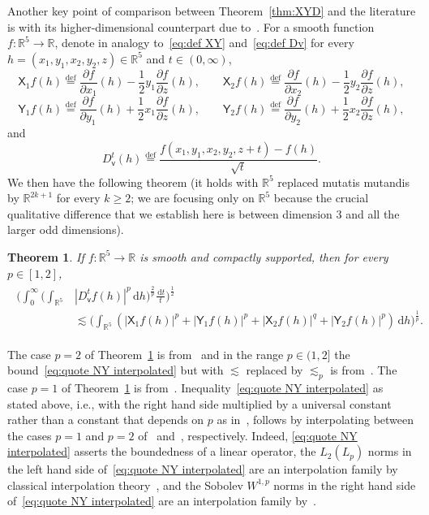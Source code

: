 \documentclass[11pt,reqno]{amsart}
\newcommand{\R}{\mathbb{R}}
\newcommand{\vv}{\mathsf{v}}
\newcommand{\XX}{\mathsf{X}}
\newcommand{\YY}{\mathsf{Y}}
\newcommand{\ud}[0]{\,\mathrm{d}}
\newcommand{\0}{\mathbf{0}}
\renewcommand{\1}{\mathbf 1}
\newcommand{\from}{\colon}
\newcommand{\eqdef}{\stackrel{\mathrm{def}}{=}}
\renewcommand{\ge}{\geqslant}
\newtheorem{thm}{Theorem}[section]
\theoremstyle{remark}
\begin{document}
Another key point of comparison between Theorem~\ref{thm:XYD} and the literature is with its higher-dimensional counterpart due to~\cite{NY18}. For a smooth function $f\from\R^5\to \R$,  denote  in analogy to~\eqref{eq:def XY} and~\eqref{eq:def Dv} for every $h=(x_1,y_1,x_2,y_2,z)\in \R^5$ and $t\in (0,\infty)$,
$$
\XX_1f(h)\eqdef \frac{\partial f}{\partial x_1}(h)-\frac{1}{2}y_1\frac{\partial f}{\partial z}(h),\qquad \XX_2f(h)\eqdef \frac{\partial f}{\partial x_2}(h)-\frac{1}{2}y_2\frac{\partial f}{\partial z}(h),
$$
$$
\YY_1f(h)\eqdef \frac{\partial f}{\partial y_1}(h)+\frac{1}{2}x_1\frac{\partial f}{\partial z}(h),\qquad \YY_2f(h)\eqdef \frac{\partial f}{\partial y_2}(h)+\frac{1}{2}x_2\frac{\partial f}{\partial z}(h),
$$
and
$$
{D}_{\vv}^t(h)\eqdef \frac{f(x_1,y_1,x_2,y_2,z+t)-f(h)}{\sqrt{t}}.
$$
We then have the following theorem (it holds with $\R^5$ replaced mutatis mutandis by $\R^{2k+1}$ for every $k\ge 2$; we are focusing only on $\R^5$ because the crucial qualitative  difference that we establish here is between dimension $3$ and all the larger odd dimensions).
\begin{thm}\label{thm:XYD-NY17}  If $f\from\R^5\to \R$ is smooth and compactly supported, then for every $p\in [1,2]$,
\begin{align}\label{eq:quote NY interpolated}
\begin{split}
\bigg(\int_0^\infty\bigg(\int_{\R^5}& |D_{\vv}^tf(h)|^p\ud h\bigg)^{\frac{2}{p}}\!\frac{\ud t}{t}\bigg)^{\frac12}\\&\lesssim \bigg(\int_{\R^5} \left(|\mathbf{\XX}_1 f(h)|^p+|\YY_1 f(h)|^p+|\mathbf{\XX}_2 f(h)|^q+|\YY_2 f(h)|^p\right)\ud h\bigg)^{\frac{1}{p}}.
\end{split}
\end{align}
\end{thm}
The case $p=2$ of Theorem~\ref{thm:XYD-NY17} is from~\cite{AusNaoTes} and in the range $p\in (1,2]$ the bound~\eqref{eq:quote NY interpolated} but with $\lesssim$ replaced by $\lesssim_p$ is from~\cite{LafforgueNaor}. The case $p=1$ of Theorem~\ref{thm:XYD-NY17} is from~\cite{NY18}. Inequality~\eqref{eq:quote NY interpolated} as stated above, i.e., with the right hand side multiplied by a universal constant rather than a constant that depends on $p$ as in~\cite{LafforgueNaor},  follows by interpolating between the cases $p=1$ and $p=2$ of~\cite{NY18} and~\cite{AusNaoTes}, respectively. Indeed, \eqref{eq:quote NY interpolated} asserts the boundedness of a linear operator, the $L_2(L_p)$ norms in the left hand side of~\eqref{eq:quote NY interpolated}  are an interpolation family by classical interpolation theory~\cite{BL76}, and the Sobolev $W^{1,p}$  norms  in the right hand side of~\eqref{eq:quote NY interpolated} are  an interpolation family by~\cite[Theorem~8.8]{Bad09}.
\end{document}
